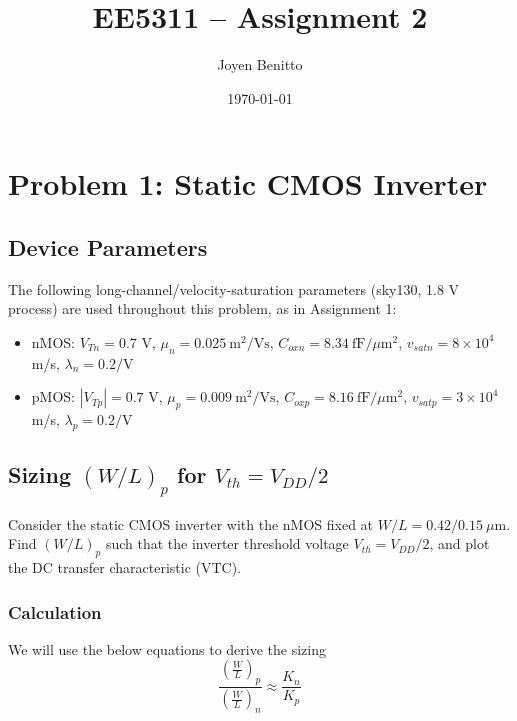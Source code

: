 \title{EE5311 -- Assignment 2}
\author{Joyen Benitto}
\date{\today}
\maketitle

\section{Problem 1: Static CMOS Inverter}

\subsection*{Device Parameters}

The following long-channel/velocity-saturation parameters (sky130, 1.8 V
process) are used throughout this problem, as in Assignment 1:

\begin{itemize}
  \item nMOS: $V_{Tn} = 0.7$ V, $\mu_n = 0.025\ \text{m}^2/\text{Vs}$, $C_{oxn} =
  8.34\ \text{fF}/\mu\text{m}^2$, $v_{satn} = 8\times10^4$ m/s, $\lambda_n =
  0.2/\text{V}$
  \item pMOS: $|V_{Tp}| = 0.7$ V, $\mu_p = 0.009\ \text{m}^2/\text{Vs}$, $C_{oxp}
  = 8.16\ \text{fF}/\mu\text{m}^2$, $v_{satp} = 3\times10^4$ m/s, $\lambda_p =
  0.2/\text{V}$
\end{itemize}

\subsection{Sizing $(W/L)_p$ for $V_{th} = V_{DD}/2$}

Consider the static CMOS inverter with the nMOS fixed at $W/L =
0.42/0.15\ \mu\text{m}$. Find $(W/L)_p$ such that the inverter threshold voltage
$V_{th} = V_{DD}/2$, and plot the DC transfer characteristic (VTC).

\subsubsection{Calculation}


We will use the below equations to derive the sizing
$$
\frac{(\frac{W}{L})_p}{(\frac{W}{L})_n} \approx \frac{K_n}{K_p}
$$

